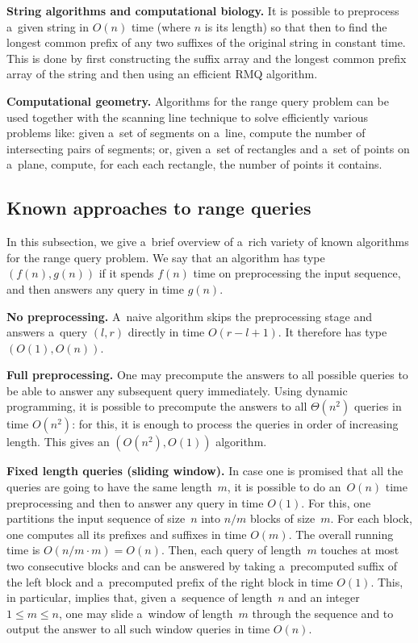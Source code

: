 \documentclass{toc}
\begin{document}
\textbf{String algorithms and computational biology.}
It is possible to preprocess a~given string in $O(n)$ time (where $n$ is its length)
so that %
then to  %
find the longest common prefix of any two suffixes of the original string in constant time. This is done by first constructing the suffix array and the longest common prefix array of the string and then using an efficient RMQ algorithm.

\textbf{Computational geometry.} Algorithms for the range %
query  %
problem
can be used together with the scanning line technique to solve efficiently various problems like: given a~set of segments on a~line, compute the number of intersecting pairs of segments; or, given a~set of rectangles and a~set of points on a~plane, compute, for each each rectangle, the number of points it contains.

\subsection{Known approaches to range queries}\label{subsec:approaches}

In this subsection, we give a~brief overview of a~rich variety of known
algorithms for the
range query
problem. We say that an algorithm has type
$(f(n), g(n))$ if it spends $f(n)$ time on preprocessing the input sequence,
and then answers any query in time $g(n)$.

\textbf{No preprocessing.} A~naive algorithm skips the preprocessing stage and
answers a~query $(l,r)$ directly in time $O(r-l+1)$. It therefore has type
$(O(1), O(n))$.

\textbf{Full preprocessing.} One may precompute the answers to all possible
queries to be able to answer any subsequent query immediately. Using dynamic
programming, it is possible to precompute the answers to all $\Theta(n^2)$
queries in time $O(n^2)$: for this, it is enough to process the queries in
order of increasing length. This gives an $(O(n^2), O(1))$ algorithm.

\textbf{Fixed length queries (sliding window).} In case one is promised that all
the queries are going to have the same length~$m$, it is possible to do
an~$O(n)$ time preprocessing and then to answer any query in time $O(1)$. For
this, one partitions the input sequence of size~$n$ into $n/m$ blocks of
size~$m$. For each block, one computes all its prefixes and suffixes in time
$O(m)$. The overall running time is $O(n/m \cdot m)=O(n)$. Then, each query
of length~$m$ touches at most two consecutive blocks and can be answered by
taking a~precomputed suffix of the left block and a~precomputed prefix of the
right block in time $O(1)$. This, in particular, implies that, given a~sequence
of length~$n$ and an integer $1 \le m \le n$, one may slide a~window of
length~$m$ through the sequence and to output the answer to all such window
queries in time $O(n)$.
\end{document}
